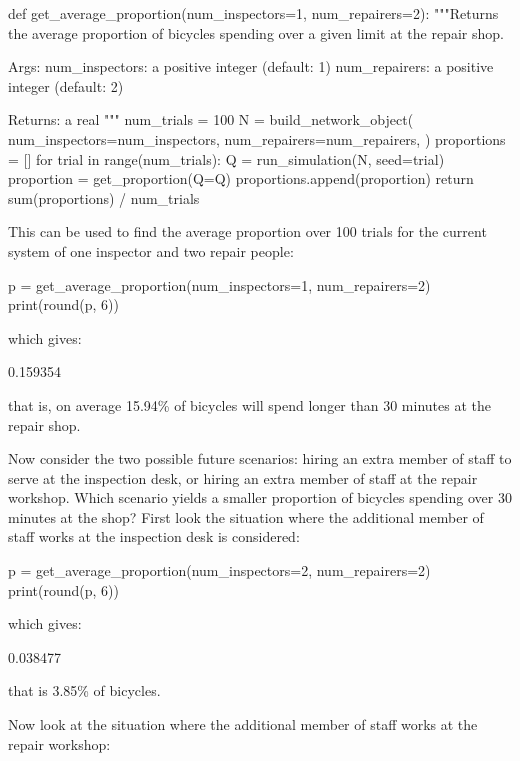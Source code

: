 \begin{pyin}
def get_average_proportion(num_inspectors=1, num_repairers=2):
    """Returns the average proportion of bicycles spending over a
    given limit at the repair shop.

    Args:
        num_inspectors: a positive integer (default: 1)
        num_repairers: a positive integer (default: 2)

    Returns:
        a real
    """
    num_trials = 100
    N = build_network_object(
        num_inspectors=num_inspectors,
        num_repairers=num_repairers,
    )
    proportions = []
    for trial in range(num_trials):
        Q = run_simulation(N, seed=trial)
        proportion = get_proportion(Q=Q)
        proportions.append(proportion)
    return sum(proportions) / num_trials
\end{pyin}

This can be used to find the average proportion over 100 trials for the current
system of one inspector and two repair people:

\begin{pyin}
p = get_average_proportion(num_inspectors=1, num_repairers=2)
print(round(p, 6))
\end{pyin}

which gives:

\begin{pyout}
0.159354
\end{pyout}

that is, on average 15.94\% of bicycles will spend longer than 30 minutes at the
repair shop.

Now consider the two possible future scenarios: hiring an
extra member of staff to serve at the inspection desk, or hiring an extra member
of staff at the repair workshop. Which scenario yields a smaller proportion of
bicycles spending over 30 minutes at the shop? First look
the situation where the additional member of staff works at the inspection desk
is considered:

\begin{pyin}
p = get_average_proportion(num_inspectors=2, num_repairers=2)
print(round(p, 6))
\end{pyin}

which gives:

\begin{pyout}
0.038477
\end{pyout}

that is 3.85\% of bicycles.

Now look at the situation where the additional member of staff works at the
repair workshop:

